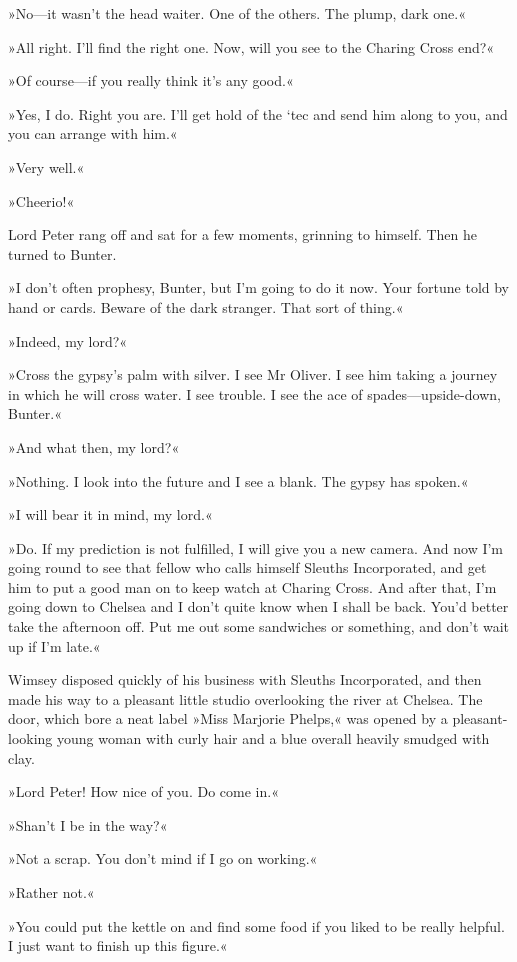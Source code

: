 »No—it wasn't the head waiter. One of the others. The plump, dark one.«

»All right. I'll find the right one. Now, will you see to the Charing Cross end?«

»Of course—if you really think it's any good.«

»Yes, I do. Right you are. I'll get hold of the `tec and send him along to you, and you can arrange with him.«

»Very well.«

»Cheerio!«

Lord Peter rang off and sat for a few moments, grinning to himself. Then he turned to Bunter.

»I don't often prophesy, Bunter, but I'm going to do it now. Your fortune told by hand or cards. Beware of the dark stranger. That sort of thing.«

»Indeed, my lord?«

»Cross the gypsy's palm with silver. I see Mr Oliver. I see him taking a journey in which he will cross water. I see trouble. I see the ace of spades—upside-down, Bunter.«

»And what then, my lord?«

»Nothing. I look into the future and I see a blank. The gypsy has spoken.«

»I will bear it in mind, my lord.«

»Do. If my prediction is not fulfilled, I will give you a new camera. And now I'm going round to see that fellow who calls himself Sleuths Incorporated, and get him to put a good man on to keep watch at Charing Cross. And after that, I'm going down to Chelsea and I don't quite know when I shall be back. You'd better take the afternoon off. Put me out some sandwiches or something, and don't wait up if I'm late.«

Wimsey disposed quickly of his business with Sleuths Incorporated, and then made his way to a pleasant little studio overlooking the river at Chelsea. The door, which bore a neat label »Miss Marjorie Phelps,« was opened by a pleasant-looking young woman with curly hair and a blue overall heavily smudged with clay.

»Lord Peter! How nice of you. Do come in.«

»Shan't I be in the way?«

»Not a scrap. You don't mind if I go on working.«

»Rather not.«

»You could put the kettle on and find some food if you liked to be really helpful. I just want to finish up this figure.«

